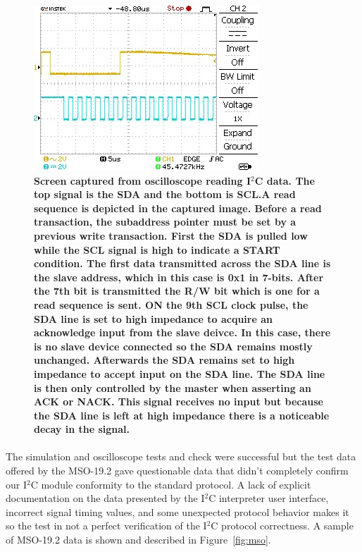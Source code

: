 \documentclass[pdftex,12pt,a4paper]{article}
\begin{document}
\begin{figure}[H]
\centering
\includegraphics{osc_receive.jpg}
\caption{\textbf{Screen captured from oscilloscope reading I$^2$C data. The top signal is the SDA and the bottom is SCL.A read sequence is depicted in the captured image. Before a read transaction, the subaddress pointer must be set by a previous write transaction. First the SDA is pulled low while the SCL signal is high to indicate a START condition. The first data transmitted across the SDA line is the slave address, which in this case is 0x1 in 7-bits. After the 7th bit is transmitted the R/W bit which is one for a read sequence is sent. ON the 9th SCL clock pulse, the SDA line is set to high impedance to acquire an acknowledge input from the slave deivce. In this case, there is no slave device connected so the SDA remains mostly unchanged. Afterwards the SDA remains set to high impedance to accept input on the SDA line. The SDA line is then only controlled by the master when asserting an ACK or NACK. This signal receives no input but because the SDA line is left at high impedance there is a noticeable decay in the signal. }}
\label{fig:osc_rx}
\end{figure}

\paragraph{}
The simulation and oscilloscope tests and check were successful but the test data offered by the MSO-19.2 gave questionable data that didn't completely confirm our I$^2$C module conformity to the standard protocol. A lack of explicit documentation on the data presented by the I$^2$C interpreter user interface, incorrect signal timing values, and some unexpected protocol behavior makes it so the test in not a perfect verification of the I$^2$C protocol correctness. A sample of MSO-19.2 data is shown and described in Figure~\ref{fig:mso}.
\end{document}
